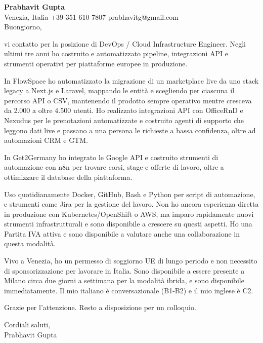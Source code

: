 \documentclass[a4paper,10.5pt]{article}
\begin{document}
\textbf{Prabhavit Gupta}\\
Venezia, Italia \textbar{} +39 351 610 7807 \textbar{} prabhavitg@gmail.com\\[10pt]
Buongiorno,

vi contatto per la posizione di DevOps / Cloud Infrastructure Engineer. Negli ultimi tre anni ho costruito e automatizzato pipeline, integrazioni API e strumenti operativi per piattaforme europee in produzione.

In FlowSpace ho automatizzato la migrazione di un marketplace live da uno stack legacy a Next.js e Laravel, mappando le entità e scegliendo per ciascuna il percorso API o CSV, mantenendo il prodotto sempre operativo mentre cresceva da 2.000 a oltre 4.500 utenti. Ho realizzato integrazioni API con OfficeRnD e Nexudus per le prenotazioni automatizzate e costruito agenti di supporto che leggono dati live e passano a una persona le richieste a bassa confidenza, oltre ad automazioni CRM e GTM.

In Get2Germany ho integrato le Google API e costruito strumenti di automazione con n8n per trovare corsi, stage e offerte di lavoro, oltre a ottimizzare il database della piattaforma.

Uso quotidianamente Docker, GitHub, Bash e Python per script di automazione, e strumenti come Jira per la gestione del lavoro. Non ho ancora esperienza diretta in produzione con Kubernetes/OpenShift o AWS, ma imparo rapidamente nuovi strumenti infrastrutturali e sono disponibile a crescere su questi aspetti. Ho una Partita IVA attiva e sono disponibile a valutare anche una collaborazione in questa modalità.

Vivo a Venezia, ho un permesso di soggiorno UE di lungo periodo e non necessito di sponsorizzazione per lavorare in Italia. Sono disponibile a essere presente a Milano circa due giorni a settimana per la modalità ibrida, e sono disponibile immediatamente. Il mio italiano è conversazionale (B1-B2) e il mio inglese è C2.

Grazie per l'attenzione. Resto a disposizione per un colloquio.

Cordiali saluti,\\
Prabhavit Gupta
\end{document}
